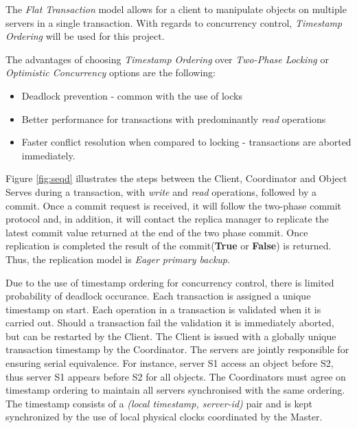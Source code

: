 \documentclass[times, 10pt,twocolumn]{article}
\begin{document}
\label{subsec:transmgt}
The {\it Flat Transaction} model allows for a client to manipulate objects on multiple servers in a single transaction. With regards to concurrency control, {\it Timestamp Ordering} will be used for this project. 

The advantages of choosing {\it Timestamp Ordering} over {\it Two-Phase Locking} or {\it Optimistic Concurrency} options are the following: 
\begin{itemize}[noitemsep, nolistsep]
\item Deadlock prevention - common with the use of locks
\item Better performance for transactions with predominantly {\it read} operations \cite{bernstein1987concurrency}
\item Faster conflict resolution when compared to locking - transactions are aborted immediately.
\end{itemize}

Figure \ref{fig:seqd} illustrates the steps between the Client, Coordinator and Object Serves during a transaction, 
with {\it write} and {\it read} operations, followed by a commit. Once a commit request is received, it will follow 
the two-phase commit protocol and, in addition, it will contact the replica manager to replicate the latest commit
value returned at the end of the two phase commit. Once replication is completed the result of the commit({\bf True}
or {\bf False}) is returned. Thus, the replication model is {\it Eager primary backup}. 

\label{subsec:dldetect}
Due to the use of timestamp ordering for concurrency control, there is limited probability of deadlock occurance.
Each transaction is assigned a unique timestamp on start. Each operation in a transaction is validated when it is carried out.
Should a transaction fail the validation it is immediately aborted, but can be restarted by the Client. The Client is issued with a globally unique transaction timestamp by the Coordinator. The servers are jointly responsible for ensuring serial equivalence. For instance, server S1 access an object before S2, thus server S1 appears before S2 for all objects. The Coordinators must agree on timestamp ordering to maintain all servers synchronised with the same ordering. The timestamp consists of a {\it (local timestamp, server-id)} pair and is kept synchronized by the use of local physical clocks coordinated by the Master.
\end{document}

